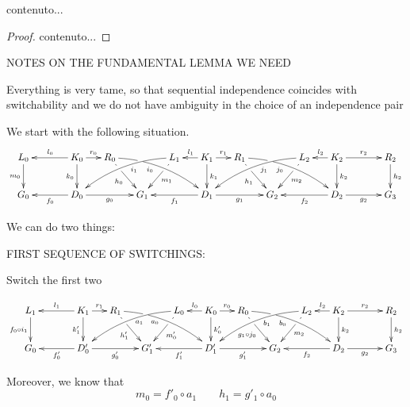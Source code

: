 \begin{corollary}
	contenuto...
\end{corollary}
\begin{proof}
	contenuto...
\end{proof}
\newpage


NOTES ON THE FUNDAMENTAL LEMMA WE NEED

Everything is very tame, so that sequential independence coincides with switchability and we do not have ambiguity in the choice of an independence pair


We start with the following situation.
	\[\xymatrix@C=15pt{L_0\ar[d]_{m_0}&& K_0 \ar[d]_{k_0}\ar[ll]_{l_0} \ar[r]^{r_0} & R_0 \ar@/^.35cm/[drrr]_(.4){i_0}|(.285)\hole \ar[dr]|(.28)\hole_{h_0} && L_1 \ar@/_.35cm/[dlll]^(.4){i_1} \ar[dl]|(.28)\hole^{m_1}& K_1 \ar[d]^{k_1}\ar[l]_{l_1} \ar[r]^{r_1} & R_1 \ar[dr]|(.28)\hole_{h_1} \ar@/^.35cm/[drrr]_(.4){j_0}|(.285)\hole  && L_2 \ar@/_.35cm/[dlll]^(.4){j_1} \ar[dl]|(.28)\hole^{m_2}& K_2 \ar[d]^{k_2}\ar[l]_{l_2} \ar[rr]^{r_2} && R_2 \ar[d]^{h_2} \\G_0 && \ar[ll]^{f_0} D_0 \ar[rr]_{g_0}&& G_1  && \ar[ll]^{f_1} D_1 \ar[rr]_{g_1}&& G_2 && \ar[ll]^{f_2} D_2 \ar[rr]_{g_2}&& G_3 }\]
	
	We can do two things:
	
	FIRST SEQUENCE OF SWITCHINGS:
	
	Switch the first two
	

	\[\xymatrix@C=15pt{L_1\ar[d]_{f_0\circ i_1}&& K_1 \ar[d]_{k'_1}\ar[ll]_{l_1} \ar[r]^{r_1} & R_1 \ar@/^.35cm/[drrr]_(.4){a_0}|(.285)\hole \ar[dr]|(.28)\hole_{h'_1} && L_0 \ar@/_.35cm/[dlll]^(.4){a_1} \ar[dl]|(.28)\hole^{m'_0}& K_0 \ar[d]^{k'_0}\ar[l]_{l_0} \ar[r]^{r_0} & R_0 \ar[dr]|(.28)\hole_{g_1\circ j_0} \ar@/^.35cm/[drrr]_(.4){b_0}|(.285)\hole  && L_2 \ar@/_.35cm/[dlll]^(.4){b_1} \ar[dl]|(.28)\hole^{m_2}& K_2 \ar[d]^{k_2}\ar[l]_{l_2} \ar[rr]^{r_2} && R_2 \ar[d]^{h_2} \\G_0 && \ar[ll]^{f'_0} D'_0 \ar[rr]_{g'_0}&& G'_1  && \ar[ll]^{f'_1} D'_1 \ar[rr]_{g'_1}&& G_2 && \ar[ll]^{f_2} D_2 \ar[rr]_{g_2}&& G_3 }\]
	
	Moreover, we know that
	\[m_0=f'_0\circ a_1 \qquad h_1=g'_1\circ a_0\]
	
